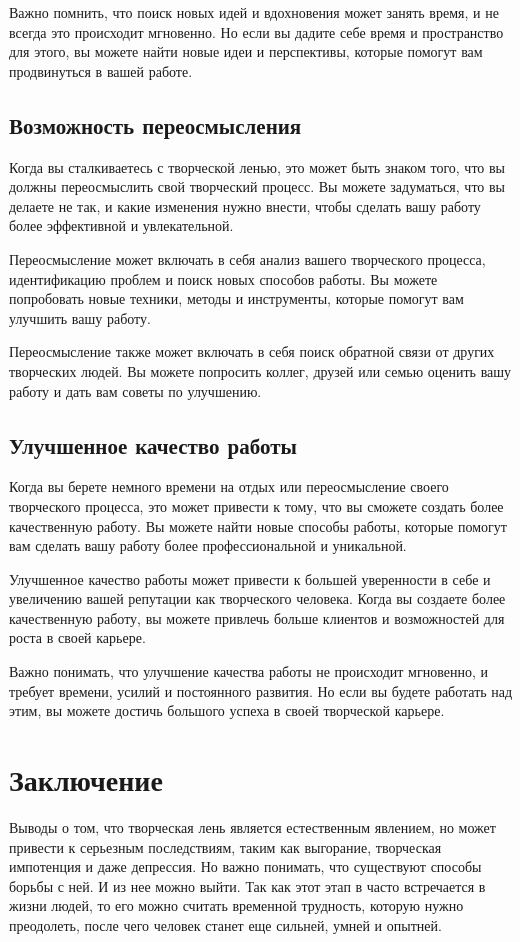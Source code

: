 \documentclass[a4paper, 14pt]{article}
\begin{document}
Важно помнить, что поиск новых идей и вдохновения может занять время, и не всегда это происходит мгновенно. Но если вы дадите себе время и пространство для этого, вы можете найти новые идеи и перспективы, которые помогут вам продвинуться в вашей работе.

\subsection{Возможность переосмысления}

Когда вы сталкиваетесь с творческой ленью, это может быть знаком того, что вы должны переосмыслить свой творческий процесс. Вы можете задуматься, что вы делаете не так, и какие изменения нужно внести, чтобы сделать вашу работу более эффективной и увлекательной. 

Переосмысление может включать в себя анализ вашего творческого процесса, идентификацию проблем и поиск новых способов работы. Вы можете попробовать новые техники, методы и инструменты, которые помогут вам улучшить вашу работу. 

Переосмысление также может включать в себя поиск обратной связи от других творческих людей. Вы можете попросить коллег, друзей или семью оценить вашу работу и дать вам советы по улучшению. 

\subsection{Улучшенное качество работы}

Когда вы берете немного времени на отдых или переосмысление своего творческого процесса, это может привести к тому, что вы сможете создать более качественную работу. Вы можете найти новые способы работы, которые помогут вам сделать вашу работу более профессиональной и уникальной. 

Улучшенное качество работы может привести к большей уверенности в себе и увеличению вашей репутации как творческого человека. Когда вы создаете более качественную работу, вы можете привлечь больше клиентов и возможностей для роста в своей карьере. 

Важно понимать, что улучшение качества работы не происходит мгновенно, и требует времени, усилий и постоянного развития. Но если вы будете работать над этим, вы можете достичь большого успеха в своей творческой карьере.


\section{Заключение}
Выводы о том, что творческая лень является естественным явлением, но может привести к серьезным последствиям, таким как выгорание, творческая импотенция и даже депрессия. Но важно понимать, что существуют способы борьбы с ней. И из нее можно выйти. Так как этот этап в часто встречается в жизни людей, то его можно считать временной трудность, которую нужно преодолеть, после чего человек станет еще сильней, умней и опытней.
\end{document}
